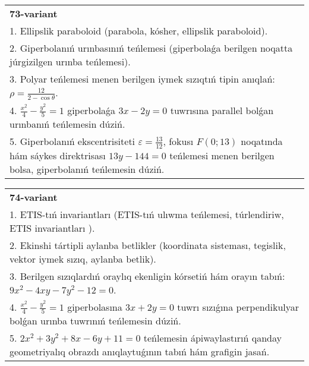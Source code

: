 \documentclass{article}
\begin{document}
\begin{tabular}{m{17cm}}
\textbf{73-variant}\\
1. Ellipslik paraboloid (parabola, kósher, ellipslik paraboloid).\\

2. Giperbolanıń urınbasınıń teńlemesi (giperbolaǵa berilgen noqatta júrgizilgen urınba teńlemesi).\\

3. Polyar teńlemesi menen berilgen iymek sızıqtıń tipin anıqlań: $\rho=\frac{12}{2-\cos\theta}$.\\

4. $\frac{x^{2}}{4} - \frac{y^{2}}{5} = 1$ giperbolaǵa $3x - 2y = 0$ tuwrısına parallel bolǵan urınbanıń teńlemesin dúziń.  \\

5. Giperbolanıń ekscentrisiteti $\varepsilon = \frac{13}{12}$, fokusı $F(0;13)$ noqatında hám sáykes direktrisası $13y - 144 = 0$ teńlemesi menen berilgen bolsa, giperbolanıń teńlemesin dúziń.  
\end{tabular}
\vspace{1cm}


\begin{tabular}{m{17cm}}
\textbf{74-variant}\\
1. ETIS-tıń invariantları (ETIS-tıń ulıwma teńlemesi, túrlendiriw, ETIS invariantları ).\\

2. Ekinshi tártipli aylanba betlikler (koordinata sisteması, tegislik, vektor iymek sızıq, aylanba betlik).\\

3. Berilgen sızıqlardıń oraylıq ekenligin kórsetiń hám orayın tabıń: $9 x^{2}-4 xy-7 y^{2}-12=0$.\\

4. $\frac{x^{2}}{4} - \frac{y^{2}}{5} = 1$ giperbolasına $3x + 2y = 0$ tuwrı sızıǵına perpendikulyar bolǵan urınba tuwrınıń teńlemesin dúziń.\\

5. $2x^{2} + 3y^{2} + 8x - 6y + 11 = 0$ teńlemesin ápiwaylastırıń qanday geometriyalıq obrazdı anıqlaytuǵının tabıń hám grafigin jasań.  
\end{tabular}
\vspace{1cm}
\end{document}
